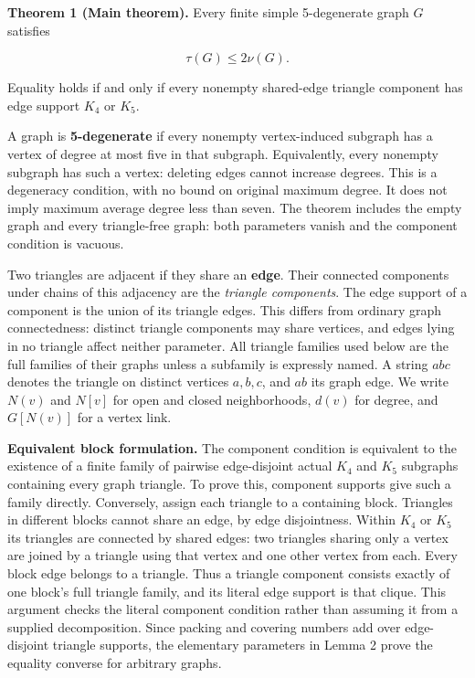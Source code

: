 \documentclass[11pt]{article}
\begin{document}
\textbf{Theorem 1 (Main theorem).} Every finite simple 5-degenerate
graph \(G\) satisfies

\[\tau(G)\le2\nu(G).\]

Equality holds if and only if every nonempty shared-edge triangle
component has edge support \(K_4\) or \(K_5\).

A graph is \textbf{5-degenerate} if every nonempty vertex-induced
subgraph has a vertex of degree at most five in that subgraph.
Equivalently, every nonempty subgraph has such a vertex: deleting edges
cannot increase degrees. This is a degeneracy condition, with no bound
on original maximum degree. It does not imply maximum average degree
less than seven. The theorem includes the empty graph and every
triangle-free graph: both parameters vanish and the component condition
is vacuous.

Two triangles are adjacent if they share an \textbf{edge}. Their
connected components under chains of this adjacency are the
\emph{triangle components}. The edge support of a component is the union
of its triangle edges. This differs from ordinary graph connectedness:
distinct triangle components may share vertices, and edges lying in no
triangle affect neither parameter. All triangle families used below are
the full families of their graphs unless a subfamily is expressly named.
A string \(abc\) denotes the triangle on distinct vertices \(a,b,c\),
and \(ab\) its graph edge. We write \(N(v)\) and \(N[v]\) for open and
closed neighborhoods, \(d(v)\) for degree, and \(G[N(v)]\) for a vertex
link.

\textbf{Equivalent block formulation.} The component condition is
equivalent to the existence of a finite family of pairwise edge-disjoint
actual \(K_4\) and \(K_5\) subgraphs containing every graph triangle. To
prove this, component supports give such a family directly. Conversely,
assign each triangle to a containing block. Triangles in different
blocks cannot share an edge, by edge disjointness. Within \(K_4\) or
\(K_5\) its triangles are connected by shared edges: two triangles
sharing only a vertex are joined by a triangle using that vertex and one
other vertex from each. Every block edge belongs to a triangle. Thus a
triangle component consists exactly of one block's full triangle family,
and its literal edge support is that clique. This argument checks the
literal component condition rather than assuming it from a supplied
decomposition. Since packing and covering numbers add over edge-disjoint
triangle supports, the elementary parameters in Lemma 2 prove the
equality converse for arbitrary graphs.
\end{document}
